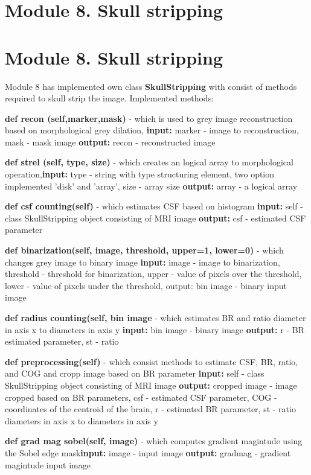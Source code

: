 \section{Module 8. Skull stripping}
\section{Module 8. Skull stripping}
Module 8 has implemented own class \textbf{SkullStripping} with consist of methods required to skull strip the image.
Implemented methods:
\begin{itemize}
    \item {\textbf{def recon (self,marker,mask)} - which is used to grey image reconstruction based on morphological grey dilation, \textbf{input:} marker - image to reconstruction, mask - mask image \textbf{output:} recon - reconstructed image}
    \item {\textbf{def strel (self, type, size)} - which creates an logical array to morphological operation,\textbf{input:} type - string with type structuring element, two option implemented 'disk' and 'array', size - array size \textbf{output:} array - a logical array}
    \item {\textbf{def csf counting(self)} - which estimates CSF based on histogram \textbf{input:} self - class SkullStripping object consisting of MRI image  \textbf{output:}  csf - estimated CSF parameter}
    \item {\textbf{def binarization(self, image, threshold, upper=1, lower=0)} - which changes grey image to binary image
    \textbf{input:} image - image to binarization, threshold - threshold for binarization, upper - value of pixels over the threshold, lower - value of pixels under the threshold, output: bin image - binary input image}
    \item {\textbf{def radius counting(self, bin image} - which estimates BR and ratio diameter in axis x to diameters in axis y \textbf{input:} bin image - binary image \textbf{output:} r - BR estimated parameter, st - ratio}
    \item {\textbf{def preprocessing(self)} - which consist methods to estimate CSF, BR, ratio, and COG and cropp image based on BR parameter \textbf{input:} self - class SkullStripping object consisting of MRI image \textbf{output:} cropped image - image cropped based on BR parameters, csf - estimated CSF parameter, COG - coordinates of the centroid of the brain, r - estimated BR parameter, st - ratio diameters in axis x to diameters in axis y
    \item {\textbf{def grad mag sobel(self, image)} - which computes gradient magintude using the Sobel edge mask\textbf{input:} image - input image \textbf{output:}  gradmag - gradient magintude input image}
}
\end{itemize}
